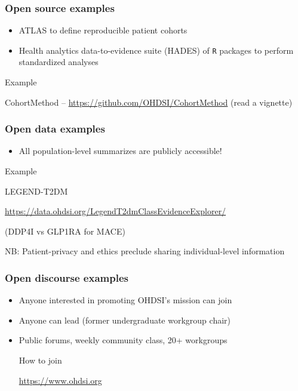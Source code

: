 \documentclass[11pt
,fragile=singleslide
,xcolor=dvipsnames, 
aspectratio=169 %
]{beamer}
\begin{document}
\begin{frame}
  \frametitle{Open source examples}
  
  \begin{itemize}
    \item ATLAS to define reproducible patient cohorts \\[2em]
    
    \item Health analytics data-to-evidence suite (HADES) of \texttt{R} packages to perform standardized analyses  \\[2em]
  \end{itemize}
  
\begin{block}{Example}
  \centerline{CohortMethod -- \url{https://github.com/OHDSI/CohortMethod} (read a vignette)}
\end{block}  
    
\end{frame}

\begin{frame}
  \frametitle{Open data examples}
  
  \begin{itemize}
  	\item All population-level summarizes are publicly accessible!  \\[2em]  
  \end{itemize}
  
\begin{block}{Example}
  \centerline{LEGEND-T2DM}
  \centerline{\url{https://data.ohdsi.org/LegendT2dmClassEvidenceExplorer/}}
  \centerline{(DDP4I vs GLP1RA for MACE)}
\end{block}    

\vspace{1em}

NB: Patient-privacy and ethics preclude sharing individual-level information

\end{frame}


\begin{frame}
  \frametitle{Open discourse examples}

  \begin{itemize}
    \item Anyone interested in promoting OHDSI's mission can join \\[2em]
    \item Anyone can lead (former undergraduate workgroup chair) \\[2em]
    \item Public forums, weekly community class, 20+ workgroups \\[2em]
 
\begin{block}{How to join}
  \centerline{\url{https://www.ohdsi.org}}
\end{block}        
    
  \end{itemize}
  
\end{frame}
\end{document}
